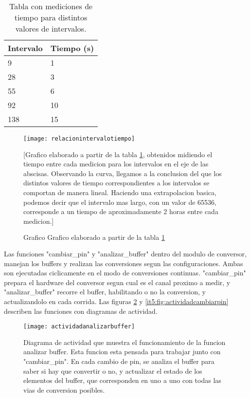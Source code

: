 \begin{table}[h]
\centering
\caption{Tabla con mediciones de tiempo para distintos valores de intervalos.}
\label{it5:tab:tablamediciones}
\begin{tabular}{|l|l|}
\hline
\rowcolor[HTML]{34CDF9} 
Intervalo & Tiempo (s) \\ \hline
\rowcolor[HTML]{CBF3FF} 
9         & 1          \\ \hline
\rowcolor[HTML]{CBF3FF} 
28        & 3          \\ \hline
\rowcolor[HTML]{CBF3FF} 
55        & 6          \\ \hline
\rowcolor[HTML]{CBF3FF} 
92        & 10         \\ \hline
\rowcolor[HTML]{CBF3FF} 
138       & 15         \\ \hline
\end{tabular}
\end{table}

\begin{figure}[h]
  \centering
  \texttt{[image: relacionintervalotiempo]}
  \caption{Grafico Grafico elaborado a partir de la tabla \ref{it5:tab:tablamediciones}}[Grafico elaborado a partir de la tabla \ref{it5:tab:tablamediciones}, obtenidos midiendo el tiempo entre cada medicion para los intervalos en el eje de las abscisas. Observando la curva, llegamos a la conclusion del que los distintos valores de tiempo correspondientes a los intervalos se comportan de manera lineal. Haciendo una extrapolacion basica, podemos decir que el intervalo mas largo, con un valor de 65536, corresponde a un tiempo de aproximadamente 2 horas entre cada medicion.]\label{it5:fig:relacionintervalotiempo}
\end{figure}

Las funciones "cambiar\_pin" y "analizar\_buffer" dentro del modulo de conversor, manejan los buffers y realizan las conversiones segun las configuraciones. Ambas son ejecutadas ciclicamente en el modo de conversiones continuas. "cambiar\_pin" prepara el hardware del conversor segun cual es el canal proximo a medir, y "analizar\_buffer" recorre el buffer, habilitando o no la conversion, y actualizandolo en cada corrida. Las figuras \ref{it5:fig:actividadanalizarbuffer} y \ref{it5:fig:actividadcambiarpin} describen las funciones con diagramas de actividad.
 
\begin{figure}[h]
  \centering
  \texttt{[image: actividadanalizarbuffer]}
  \caption[Diagrama de actividad de la funcion analizar buffer]{Diagrama de actividad que muestra el funcionamiento de la funcion analizar buffer. Esta funcion esta pensada para trabajar junto con "cambiar\_pin". En cada cambio de pin, se analiza el buffer para saber si hay que convertir o no, y actualizar el estado de los elementos del buffer, que corresponden en uno a uno con todas las vias de conversion posibles.}\label{it5:fig:actividadanalizarbuffer}
\end{figure}



